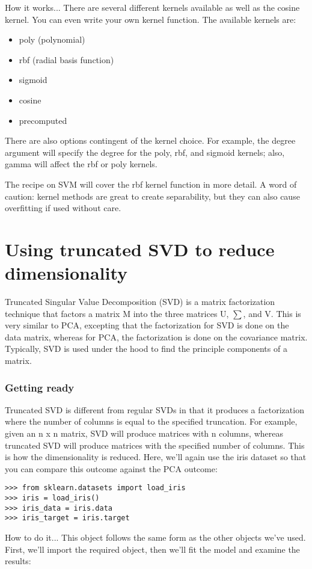 \documentclass[SKL-MASTER.tex]{subfiles}
\begin{document}
How it works...
There are several different kernels available as well as the cosine kernel. You can even write
your own kernel function. The available kernels are:
\begin{itemize}
\item poly (polynomial)
\item rbf (radial basis function)
\item sigmoid
\item cosine
\item precomputed
\end{itemize}
There are also options contingent of the kernel choice. For example, the degree argument will
specify the degree for the poly, rbf, and sigmoid kernels; also, gamma will affect the rbf
or poly kernels.

The recipe on SVM will cover the rbf kernel function in more detail.
A word of caution: kernel methods are great to create separability, but they can also cause
overfitting if used without care.
\newpage
\section*{Using truncated SVD to reduce dimensionality}
Truncated Singular Value Decomposition (SVD) is a matrix factorization technique that
factors a matrix M into the three matrices U, $\sum$, and V. This is very similar to PCA, excepting
that the factorization for SVD is done on the data matrix, whereas for PCA, the factorization
is done on the covariance matrix. Typically, SVD is used under the hood to find the principle
components of a matrix.
\subsubsection{Getting ready}
Truncated SVD is different from regular SVDs in that it produces a factorization where the
number of columns is equal to the specified truncation. For example, given an n x n matrix,
SVD will produce matrices with n columns, whereas truncated SVD will produce matrices
with the specified number of columns. This is how the dimensionality is reduced.
Here, we'll again use the iris dataset so that you can compare this outcome against the
PCA outcome:
\begin{framed}
	\begin{verbatim}
>>> from sklearn.datasets import load_iris
>>> iris = load_iris()
>>> iris_data = iris.data
>>> iris_target = iris.target
\end{verbatim}
\end{framed}
How to do it...
This object follows the same form as the other objects we've used. First, we'll import the
required object, then we'll fit the model and examine the results:
\end{document}
